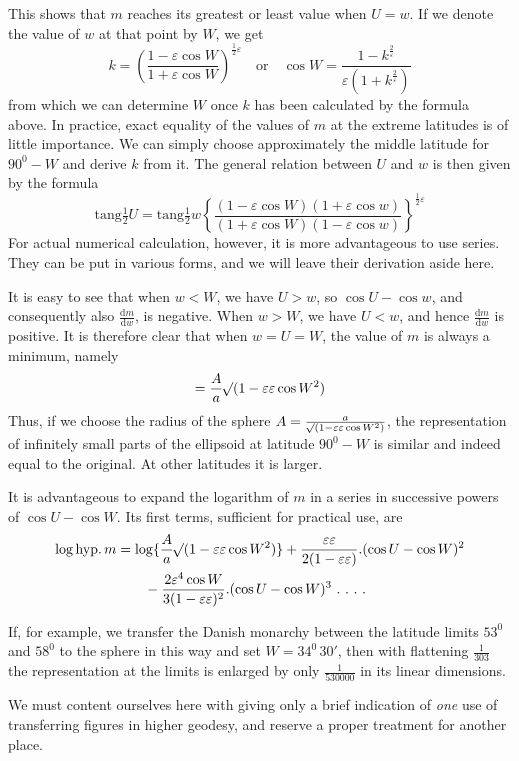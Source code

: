 \noindent This shows that \(m\) reaches its greatest or least value when \(U=w\). If we denote the value of \(w\) at that point by \(W\), we get
\[
k=(\frac{1-\varepsilon\cos W}{1+\varepsilon\cos W})^{\frac{1}{2}\varepsilon}\quad\text{or}\quad \cos W=\frac{1-k^{\frac{2}{\varepsilon}}}{\varepsilon(1+k^{\frac{2}{\varepsilon}})}
\]
\noindent from which we can determine \(W\) once \(k\) has been calculated by the formula above. In practice, exact equality of the values of \(m\) at the extreme latitudes is of little importance. We can simply choose approximately the middle latitude for \(90^0-W\) and derive \(k\) from it. The general relation between \(U\) and \(w\) is then given by the formula
\[
\mathrm{tang}\tfrac{1}{2}U=\mathrm{tang}\tfrac{1}{2}w\left\{\frac{(1-\varepsilon\cos W)(1+\varepsilon\cos w)}{(1+\varepsilon\cos W)(1-\varepsilon\cos w)}\right\}^{\frac{1}{2}\varepsilon}
\]
\noindent For actual numerical calculation, however, it is more advantageous to use series. They can be put in various forms, and we will leave their derivation aside here.

It is easy to see that when \(w<W\), we have \(U>w\), so \(\cos U-\cos w\), and consequently also \(\frac{\mathrm{d}m}{\mathrm{d}w}\), is negative. When \(w>W\), we have \(U<w\), and hence \(\frac{\mathrm{d}m}{\mathrm{d}w}\) is positive. It is therefore clear that when \(w=U=W\), the value of \(m\) is always a minimum, namely
\[
=\frac{A}{a}\mathord{{}^{}\!\surd}(1-\varepsilon\varepsilon\cos W^2)
\]
\noindent Thus, if we choose the radius of the sphere \(A=\frac{a}{\mathord{{}^{}\!\surd}(1-\varepsilon\varepsilon\cos W^2)}\), the representation of infinitely small parts of the ellipsoid at latitude \(90^0-W\) is similar and indeed equal to the original. At other latitudes it is larger.

It is advantageous to expand the logarithm of \(m\) in a series in successive powers of \(\cos U-\cos W\). Its first terms, sufficient for practical use, are
%
\[
\begin{aligned}
\log\mathrm{hyp}.\,m&=\log\{\frac{A}{a}\BareRoot{(1-\varepsilon\varepsilon\cos W^2)}\}+\frac{\varepsilon\varepsilon}{2(1-\varepsilon\varepsilon)}\mathord{.}(\cos U-\cos W)^2\\
&\qquad-\frac{2\varepsilon^4\cos W}{3(1-\varepsilon\varepsilon)^2}\mathord{.}(\cos U-\cos W)^3\ .\ .\ .\ .
\end{aligned}
\]
\par\indent If, for example, we transfer the Danish monarchy between the latitude limits \(53^0\) and \(58^0\) to the sphere in this way and set \(W=34^0\,30'\), then with flattening \(\frac{1}{303}\) the representation at the limits is enlarged by only \(\frac{1}{530000}\) in its linear dimensions.

We must content ourselves here with giving only a brief indication of \textit{one} use of transferring figures in higher geodesy, and reserve a proper treatment for another place.

